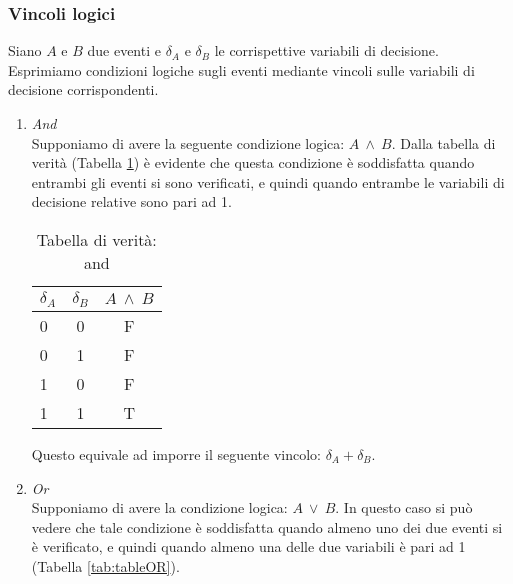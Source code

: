 \subsubsection*{Vincoli logici}
Siano $A$ e $B$ due eventi e $\delta_A$ e $\delta_B$ le corrispettive variabili di decisione. Esprimiamo condizioni logiche sugli eventi mediante vincoli sulle variabili di decisione corrispondenti.
\begin{enumerate}
\item \textit{And}\\
Supponiamo di avere la seguente condizione logica: $A~\wedge~B$.
Dalla tabella di verità (Tabella \ref{tab:tableAND}) è evidente che questa condizione è soddisfatta quando entrambi gli eventi si sono verificati, e quindi quando entrambe le variabili di decisione relative sono pari ad 1.

\begin{table}[h!]
  \begin{center}
    \begin{tabular}{l|c|c} %
      $\delta_A$ & $\delta_B$ & $A~\wedge~B$ \\
      \hline
      0 & 0 & F\\
      0 & 1 & F\\
      1 & 0 & F\\
      1 & 1 & T\\
    \end{tabular}
    \caption{Tabella di verità: and}
    \label{tab:tableAND}
  \end{center}
\end{table}

Questo equivale ad imporre il seguente vincolo: $\delta_A + \delta_B$.

\item \textit{Or}\\
Supponiamo di avere la condizione logica: $A~\vee~B$.
In questo caso si può vedere che tale condizione è soddisfatta quando almeno uno dei due eventi si è verificato, e quindi quando almeno una delle due variabili è pari ad 1 (Tabella \ref{tab:tableOR}).\\\\


\end{enumerate}
